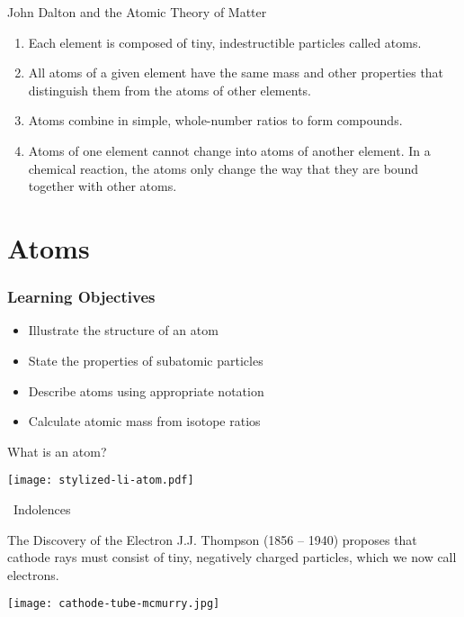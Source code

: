 \documentclass[notes=only]{beamer}
\begin{document}
\begin{frame}{John Dalton and the Atomic Theory of Matter}
	\begin{enumerate}[<+->]
		\item Each element is composed of tiny, indestructible particles
			called atoms.
		\item All atoms of a given element have the same mass and other
			properties that distinguish them from the atoms of other
			elements.
		\item Atoms combine in simple, whole-number ratios to form
			compounds.
		\item Atoms of one element cannot change into atoms of another
			element. In a chemical reaction, the atoms only change
			the way that they are \alert{bound together} with other
			atoms.
	\end{enumerate}
\end{frame}

\section{Atoms}

\begin{frame}
	\frametitle{Learning Objectives}

	\begin{itemize}
		\item Illustrate the structure of an atom
		\item State the properties of subatomic particles
		\item Describe atoms using appropriate notation
		\item Calculate atomic mass from isotope ratios
	\end{itemize}
\end{frame}



\begin{frame}{What is an atom?}
	\centering

	\texttt{[image: stylized-li-atom.pdf]}

	\bigskip

	\tiny\ccbysa\ Indolences
\end{frame}

\begin{frame}{The Discovery of the Electron}
	J.J. Thompson (1856 -- 1940) proposes that cathode rays must consist of
	tiny, negatively charged particles, which we now call \alert{electrons}.

	\begin{center}
		\texttt{[image: cathode-tube-mcmurry.jpg]}
	\end{center}
\end{frame}
\end{document}
